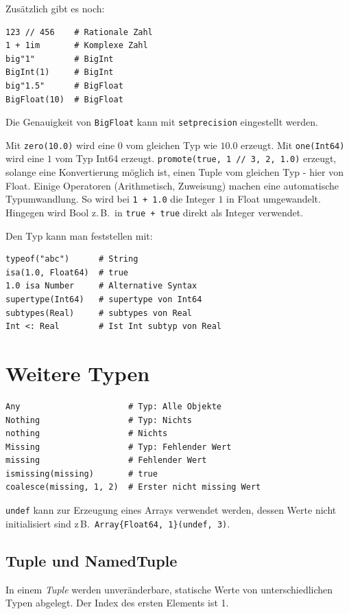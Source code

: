 \documentclass[10pt,twocolumn]{scrartcl}
\begin{document}
Zusätzlich gibt es noch:
\begin{lstlisting}
123 // 456    # Rationale Zahl
1 + 1im       # Komplexe Zahl
big"1"        # BigInt
BigInt(1)     # BigInt
big"1.5"      # BigFloat
BigFloat(10)  # BigFloat
\end{lstlisting}

Die Genauigkeit von \lstinline|BigFloat| kann mit \lstinline|setprecision| eingestellt werden.

Mit \lstinline|zero(10.0)| wird eine $0$ vom gleichen Typ wie $10.0$ erzeugt.
Mit \lstinline|one(Int64)| wird eine $1$ vom Typ Int64 erzeugt.
\lstinline|promote(true, 1 // 3, 2, 1.0)| erzeugt, solange eine Konvertierung
möglich ist, einen Tuple vom gleichen Typ - hier von Float. Einige Operatoren
(Arithmetisch, Zuweisung) machen eine automatische Typumwandlung. So wird bei
\lstinline|1 + 1.0| die Integer $1$ in Float umgewandelt. Hingegen wird Bool z.\,B.\ in \lstinline|true + true| direkt als Integer verwendet. 

Den Typ kann man feststellen mit:
\begin{lstlisting}
typeof("abc")      # String
isa(1.0, Float64)  # true
1.0 isa Number     # Alternative Syntax
supertype(Int64)   # supertype von Int64
subtypes(Real)     # subtypes von Real
Int <: Real        # Ist Int subtyp von Real
\end{lstlisting}

\section{Weitere Typen}
\label{sec:weitereTypen}

\begin{lstlisting}
Any                      # Typ: Alle Objekte
Nothing                  # Typ: Nichts
nothing                  # Nichts
Missing                  # Typ: Fehlender Wert
missing                  # Fehlender Wert
ismissing(missing)       # true
coalesce(missing, 1, 2)  # Erster nicht missing Wert
\end{lstlisting}

\lstinline|undef| kann zur Erzeugung eines Arrays verwendet werden, dessen Werte
nicht initialisiert sind z\,B.\ \lstinline|Array{Float64, 1}(undef, 3)|.

\subsection{Tuple und NamedTuple}
\label{ssec:tuple}

In einem \emph{Tuple} werden unveränderbare, statische Werte von unterschiedlichen Typen abgelegt. Der Index des ersten Elements ist 1.
\end{document}
